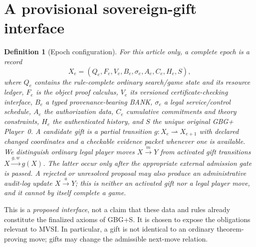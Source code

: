 \documentclass[11pt,letterpaper]{article}
\newtheorem{definition}{Definition}[section]
\theoremstyle{remark}
\begin{document}
\section{A provisional sovereign-gift interface}
\begin{definition}[Epoch configuration]\label{def:epoch}
For this article only, a complete epoch is a record
\[
X_e=(Q_e,F_e,V_e,B_e,\sigma_e,A_e,C_e,H_e,S),
\]
where $Q_e$ contains the rule-complete ordinary search/game state and its resource ledger, $F_e$ is the object proof calculus, $V_e$ its versioned certificate-checking interface, $B_e$ a typed provenance-bearing BANK, $\sigma_e$ a legal service/control schedule, $A_e$ the authorization data, $C_e$ cumulative commitments and theory constraints, $H_e$ the authenticated history, and $S$ the \emph{unique original} GBG+ Player~0. A candidate gift is a partial transition $g:X_e\rightharpoonup X_{e+1}$ with declared changed coordinates and a checkable evidence packet whenever one is available. We distinguish ordinary legal player moves $X\xrightarrow{m}Y$ from activated gift transitions $X\xrightarrow{g,w}g(X)$. The latter occur only after the appropriate external admission gate is passed. A rejected or unresolved proposal may also produce an administrative audit-log update $X\xrightarrow{a}Y$; this is neither an activated gift nor a legal player move, and it cannot by itself complete a game.
\end{definition}

This is a \emph{proposed interface}, not a claim that these data and rules already constitute the finalized axioms of GBG+S. It is chosen to expose the obligations relevant to MVSI. In particular, a gift is not identical to an ordinary theorem-proving move; gifts may change the admissible next-move relation.
\end{document}
